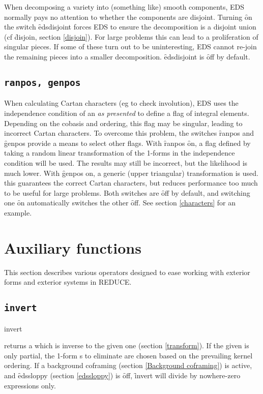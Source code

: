 When decomposing a variety into (something like) smooth components, EDS
normally pays no attention to whether the components are disjoint. Turning
\f{on} the switch \f{edsdisjoint} forces EDS to ensure the decomposition is
a disjoint union (cf \f{disjoin}, section \ref{disjoin}). For large
problems this can lead to a proliferation of singular pieces. If some of
these turn out to be uninteresting, EDS cannot re-join the remaining pieces
into a smaller decomposition. \f{edsdisjoint} is \f{off} by default.

\subsection{\tt ranpos, genpos}
\label{ranpos}

When calculating Cartan characters (eg to check involution), EDS uses the
independence condition of an  {\em as presented} to define a flag
of integral elements. Depending on the cobasis and ordering, this flag may
be singular, leading to incorrect Cartan characters. To overcome this
problem, the switches \f{ranpos} and \f{genpos} provide a means to select
other flags. With \f{ranpos} \f{on}, a flag defined by taking a random
linear transformation of the 1-forms in the independence condition will be
used. The results may still be incorrect, but the likelihood is much lower.
With \f{genpos} on, a generic (upper triangular) transformation is
used. this guarantees the correct Cartan characters, but reduces
performance too much to be useful for large problems. Both switches are
\f{off} by default, and switching one \f{on} automatically switches the other
\f{off}. See section \ref{characters} for an example.



\section{Auxiliary functions}
\label{Auxiliary functions}

This section describes various operators designed to ease working with
exterior forms and exterior systems in REDUCE.

\subsection{\tt invert}
\label{invert}

\begin{syntax}
	invert 
\end{syntax}
returns a  which is inverse to the given one (section
\ref{transform}). If the  given is only partial, the
1-form s to eliminate are chosen based on the prevailing
kernel ordering. If a background coframing (section \ref{Background
coframing}) is active, and \f{edssloppy} (section \ref{edssloppy}) is
\f{off}, \f{invert} will divide by nowhere-zero expressions only.

